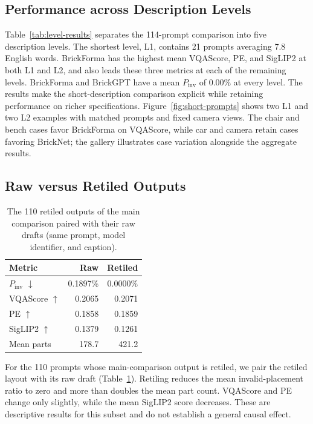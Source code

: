 \documentclass[letterpaper]{article} %
\begin{document}
\subsection{Performance across Description Levels}
Table~\ref{tab:level-results} separates the 114-prompt comparison into five description levels. The shortest level, L1, contains 21 prompts averaging 7.8 English words. BrickForma has the highest mean VQAScore, PE, and SigLIP2 at both L1 and L2, and also leads these three metrics at each of the remaining levels. BrickForma and BrickGPT have a mean $P_{\mathrm{inv}}$ of 0.00\% at every level. The results make the short-description comparison explicit while retaining performance on richer specifications. Figure~\ref{fig:short-prompts} shows two L1 and two L2 examples with matched prompts and fixed camera views. The chair and bench cases favor BrickForma on VQAScore, while car and camera retain cases favoring BrickNet; the gallery illustrates case variation alongside the aggregate results.

\subsection{Raw versus Retiled Outputs}
\begin{table}[t]
\centering
\small
\begin{tabular}{lrr}
\toprule
Metric & Raw & Retiled \\
\midrule
$P_{\mathrm{inv}}$ $\downarrow$ & 0.1897\% & 0.0000\% \\
VQAScore $\uparrow$ & 0.2065 & 0.2071 \\
PE $\uparrow$ & 0.1858 & 0.1859 \\
SigLIP2 $\uparrow$ & 0.1379 & 0.1261 \\
Mean parts & 178.7 & 421.2 \\
\bottomrule
\end{tabular}
\caption{The 110 retiled outputs of the main comparison paired with their raw drafts (same prompt, model identifier, and caption).}
\label{tab:raw-retiled}
\end{table}
For the 110 prompts whose main-comparison output is retiled, we pair the retiled layout with its raw draft (Table~\ref{tab:raw-retiled}). Retiling reduces the mean invalid-placement ratio to zero and more than doubles the mean part count. VQAScore and PE change only slightly, while the mean SigLIP2 score decreases. These are descriptive results for this subset and do not establish a general causal effect.
\end{document}
